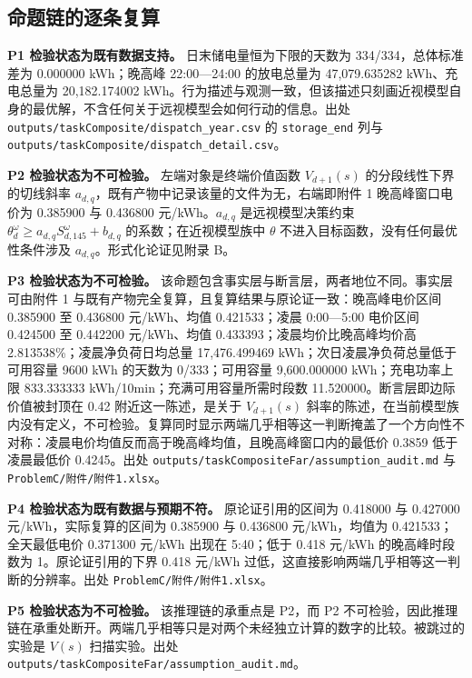 \begin{appendices}
\subsection{命题链的逐条复算}

\textbf{P1 检验状态为既有数据支持。} 日末储电量恒为下限的天数为 334/334，总体标准差为 0.000000 kWh；晚高峰 22:00---24:00 的放电总量为 47,079.635282 kWh、充电总量为 20,182.174002 kWh。行为描述与观测一致，但该描述只刻画近视模型自身的最优解，不含任何关于远视模型会如何行动的信息。出处 \texttt{outputs/\allowbreak taskComposite/\allowbreak dispatch\_year.csv} 的 \texttt{storage\_end} 列与 \texttt{outputs/\allowbreak taskComposite/\allowbreak dispatch\_detail.csv}。

\textbf{P2 检验状态为不可检验。} 左端对象是终端价值函数 $V_{d+1}(s)$ 的分段线性下界的切线斜率 $a_{d,q}$，既有产物中记录该量的文件为无，右端即附件 1 晚高峰窗口电价为 0.385900 与 0.436800 元/kWh。$a_{d,q}$ 是远视模型决策约束 $\theta^{\omega}_{d}\ge a_{d,q}S^{\omega}_{d,145}+b_{d,q}$ 的系数；在近视模型族中 $\theta$ 不进入目标函数，没有任何最优性条件涉及 $a_{d,q}$。形式化论证见附录 B。

\textbf{P3 检验状态为不可检验。} 该命题包含事实层与断言层，两者地位不同。事实层可由附件 1 与既有产物完全复算，且复算结果与原论证一致：晚高峰电价区间 0.385900 至 0.436800 元/kWh、均值 0.421533；凌晨 0:00---5:00 电价区间 0.424500 至 0.442200 元/kWh、均值 0.433393；凌晨均价比晚高峰均价高 2.813538\%；凌晨净负荷日均总量 17,476.499469 kWh；次日凌晨净负荷总量低于可用容量 9600 kWh 的天数为 0/333；可用容量 9,600.000000 kWh；充电功率上限 833.333333 kWh/10min；充满可用容量所需时段数 11.520000。断言层即边际价值被封顶在 0.42 附近这一陈述，是关于 $V_{d+1}(s)$ 斜率的陈述，在当前模型族内没有定义，不可检验。复算同时显示两端几乎相等这一判断掩盖了一个方向性不对称：凌晨电价均值反而高于晚高峰均值，且晚高峰窗口内的最低价 0.3859 低于凌晨最低价 0.4245。出处 \texttt{outputs/\allowbreak taskCompositeFar/\allowbreak assumption\_audit.md} 与 \texttt{ProblemC/附件/附件1.xlsx}。

\textbf{P4 检验状态为既有数据与预期不符。} 原论证引用的区间为 0.418000 与 0.427000 元/kWh，实际复算的区间为 0.385900 与 0.436800 元/kWh，均值为 0.421533；全天最低电价 0.371300 元/kWh 出现在 5:40；低于 0.418 元/kWh 的晚高峰时段数为 1。原论证引用的下界 0.418 元/kWh 过低，这直接影响两端几乎相等这一判断的分辨率。出处 \texttt{ProblemC/附件/附件1.xlsx}。

\textbf{P5 检验状态为不可检验。} 该推理链的承重点是 P2，而 P2 不可检验，因此推理链在承重处断开。两端几乎相等只是对两个未经独立计算的数字的比较。被跳过的实验是 $V(s)$ 扫描实验。出处 \texttt{outputs/\allowbreak taskCompositeFar/\allowbreak assumption\_audit.md}。


\end{appendices}
